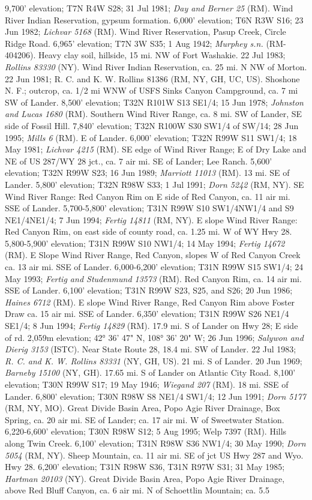 9,700' elevation; T7N R4W S28; 31 Jul 1981; \textit{Day and Berner 25} (RM).  Wind River Indian Reservation, gypsum formation. 6,000' elevation; T6N R3W S16; 23 Jun 1982; \textit{Lichvar 5168} (RM).  Wind River Reservation, Pasup Creek, Circle Ridge Road. 6,965' elevation; T7N 3W S35; 1 Aug 1942; \textit{Murphey s.n.} (RM-404206).  Heavy clay soil, hillside, 15 mi. NW of Fort Washakie. 22 Jul 1983; \textit{Rollins 83330} (NY).  Wind River Indian Reservation, ca. 25 mi. N NW of Morton.  22 Jun 1981; R. C. and K. W. Rollins 81386 (RM, NY, GH, UC, US).  Shoshone N. F.; outcrop, ca. 1/2 mi WNW of USFS Sinks Canyon Campground, ca. 7 mi SW of Lander. 8,500' elevation; T32N R101W S13 SE1/4; 15 Jun 1978; \textit{Johnston and Lucas 1680} (RM).  Southern Wind River Range, ca. 8 mi. SW of Lander, SE side of Fossil Hill. 7,840' elevation; T32N R100W S30 SW1/4 of SW/14; 28 Jun 1995; \textit{Mills 6} (RM).  E of Lander. 6,000' elevation; T32N R99W S11 SW1/4; 18 May 1981; \textit{Lichvar 4215} (RM).  SE edge of Wind River Range; E of Dry Lake and NE of US 287/WY 28 jct., ca. 7 air mi. SE of Lander; Lee Ranch. 5,600' elevation; T32N R99W S23; 16 Jun 1989; \textit{Marriott 11013} (RM).  13 mi. SE of Lander. 5,800' elevation; T32N R98W S33; 1 Jul 1991; \textit{Dorn 5242} (RM, NY).  SE Wind River Range: Red Canyon Rim on E side of Red Canyon, ca. 11 air mi. SSE of Lander.  5,700-5,800' elevation; T31N R99W S10 SW1/4NW1/4 and S9 NE1/4NE1/4; 7 Jun 1994; \textit{Fertig 14811} (RM, NY).  E slope Wind River Range: Red Canyon Rim, on east side of county road, ca. 1.25 mi. W of WY Hwy 28. 5,800-5,900' elevation; T31N R99W S10 NW1/4; 14 May 1994; \textit{Fertig 14672} (RM).  E Slope Wind River Range, Red Canyon,  slopes W of Red Canyon Creek ca. 13 air mi. SSE of Lander. 6,000-6,200' elevation; T31N R99W S15 SW1/4; 24 May 1993; \textit{Fertig and Studenmund 13573} (RM).  Red Canyon Rim, ca. 14 air mi. SSE of Lander. 6,100' elevation; T31N R99W S23, S25, and S26; 20 Jun 1986; \textit{Haines 6712} (RM).  E slope Wind River Range, Red Canyon Rim above Foster Draw ca. 15 air mi. SSE of Lander.  6,350' elevation; T31N R99W S26 NE1/4 SE1/4; 8 Jun 1994; \textit{Fertig 14829} (RM).  17.9 mi. S of Lander on Hwy 28; E side of rd. 2,059m elevation; 42° 36' 47" N, 108° 36' 20" W; 26 Jun 1996; \textit{Salywon and Dierig 3153} (ISTC).  Near State Route 28, 18.4 mi. SW of Lander. 22 Jul 1983; \textit{R. C. and K. W. Rollins 83331} (NY, GH, US).  21 mi. S of Lander. 20 Jun 1969; \textit{Barneby 15100} (NY, GH).  17.65 mi. S of Lander on Atlantic City Road. 8,100' elevation; T30N R99W S17; 19 May 1946; \textit{Wiegand 207} (RM).  18 mi. SSE of Lander. 6,800' elevation; T30N R98W S8 NE1/4 SW1/4; 12 Jun 1991; \textit{Dorn 5177} (RM, NY, MO).  Great Divide Basin Area, Popo Agie River Drainage, Box Spring, ca. 20 air mi. SE of Lander; ca. 17 air mi. W of Sweetwater Station. 6,220-6,600' elevation; T30N R98W S12; 5 Aug 1995; Welp 7397 (RM).  Hills along Twin Creek. 6,100' elevation; T31N R98W S36 NW1/4; 30 May 1990; \textit{Dorn 5054} (RM, NY).  Sheep Mountain, ca. 11 air mi. SE of jct US Hwy 287 and Wyo. Hwy 28. 6,200' elevation; T31N R98W S36, T31N R97W S31; 31 May 1985; \textit{Hartman 20103} (NY).  Great Divide Basin Area, Popo Agie River Drainage, above Red Bluff Canyon, ca. 6 air mi. N of Schoettlin Mountain; ca. 5.5 